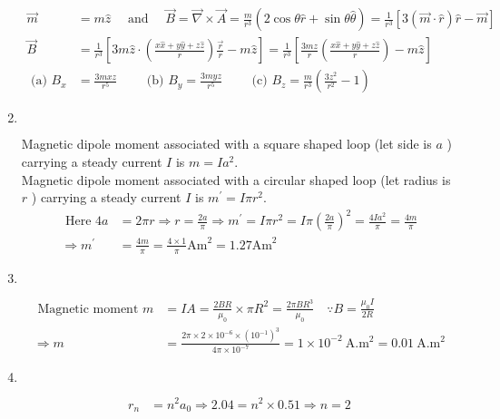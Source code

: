 \begin{enumerate}
\begin{answer}
\begin{align*}
		\vec{m}&=m \hat{z} \quad\text{ and }\quad \vec{B}=\vec{\nabla} \times \vec{A}=\frac{m}{r^{3}}(2 \cos \theta \hat{r}+\sin \theta \hat{\theta})=\frac{1}{r^{3}}[3(\vec{m} \cdot \hat{r}) \hat{r}-\vec{m}]\\
		\vec{B}&=\frac{1}{r^{3}}\left[3 m \hat{z} \cdot\left(\frac{x \hat{x}+y \hat{y}+z \hat{z}}{r}\right) \frac{\vec{r}}{r}-m \hat{z}\right]=\frac{1}{r^{3}}\left[\frac{3 m z}{r}\left(\frac{x \hat{x}+y \hat{y}+z \hat{z}}{r}\right)-m \hat{z}\right]\\
	\text{	(a) }B_{x}&=\frac{3 m x z}{r^{5}}\qquad
	\text{	(b) }B_{y}=\frac{3 m y z}{r^{5}}\qquad
	\text{	(c) }B_{z}=\frac{m}{r^{3}}\left(\frac{3 z^{2}}{r^{2}}-1\right)
		\end{align*}
	\end{answer}
	\item $\left. \right. $
	\begin{answer}
		 Magnetic dipole moment associated with a square shaped loop (let side is $a$ ) carrying a steady current $I$ is $m=I a^{2}$.\\
		Magnetic dipole moment associated with a circular shaped loop (let radius is $r$ ) carrying a steady current $I$ is $m^{\prime}=I \pi r^{2}$.
		\begin{align*}
	\text{	Here }4 a&=2 \pi r \Rightarrow r=\frac{2 a}{\pi} \Rightarrow m^{\prime}=I \pi r^{2}=I \pi\left(\frac{2 a}{\pi}\right)^{2}=\frac{4 I a^{2}}{\pi}=\frac{4 m}{\pi}\\
		\Rightarrow m^{\prime}&=\frac{4 m}{\pi}=\frac{4 \times 1}{\pi} \mathrm{Am}^{2}=1.27 \mathrm{Am}^{2}
		\end{align*}
	\end{answer}
	\item $\left. \right. $
	\begin{answer}
		\begin{align*}
	\text{ Magnetic moment }m&=I A=\frac{2 B R}{\mu_{0}} \times \pi R^{2}=\frac{2 \pi B R^{3}}{\mu_{0}} \quad \because B=\frac{\mu_{0} I}{2 R}\\
		\Rightarrow m&=\frac{2 \pi \times 2 \times 10^{-6} \times\left(10^{-1}\right)^{3}}{4 \pi \times 10^{-7}}=1 \times 10^{-2} \mathrm{~A} . \mathrm{m}^{2}=0.01 \mathrm{~A} . \mathrm{m}^{2}
		\end{align*}
	\end{answer}
	\item $\left. \right. $
	\begin{answer}
		\begin{align*}
		r_{n}&=n^{2} a_{0} \Rightarrow 2.04=n^{2} \times 0.51 \Rightarrow n=2\\

\end{align*}
\end{answer}
\end{enumerate}
